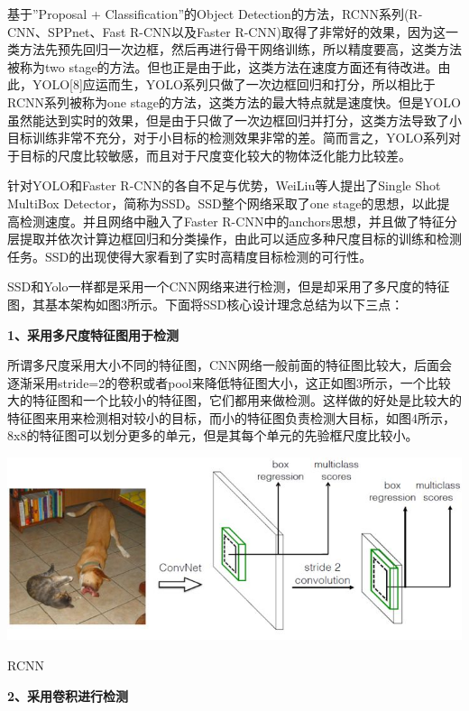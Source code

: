 基于”Proposal + Classification”的Object Detection的方法，RCNN系列(R-CNN、SPPnet、Fast R-CNN以及Faster R-CNN)取得了非常好的效果，因为这一类方法先预先回归一次边框，然后再进行骨干网络训练，所以精度要高，这类方法被称为two stage的方法。但也正是由于此，这类方法在速度方面还有待改进。由此，YOLO[8]应运而生，YOLO系列只做了一次边框回归和打分，所以相比于RCNN系列被称为one stage的方法，这类方法的最大特点就是速度快。但是YOLO虽然能达到实时的效果，但是由于只做了一次边框回归并打分，这类方法导致了小目标训练非常不充分，对于小目标的检测效果非常的差。简而言之，YOLO系列对于目标的尺度比较敏感，而且对于尺度变化较大的物体泛化能力比较差。

针对YOLO和Faster R-CNN的各自不足与优势，WeiLiu等人提出了Single Shot MultiBox Detector，简称为SSD。SSD整个网络采取了one stage的思想，以此提高检测速度。并且网络中融入了Faster R-CNN中的anchors思想，并且做了特征分层提取并依次计算边框回归和分类操作，由此可以适应多种尺度目标的训练和检测任务。SSD的出现使得大家看到了实时高精度目标检测的可行性。

SSD和Yolo一样都是采用一个CNN网络来进行检测，但是却采用了多尺度的特征图，其基本架构如图3所示。下面将SSD核心设计理念总结为以下三点：

\textbf{1、采用多尺度特征图用于检测 }

所谓多尺度采用大小不同的特征图，CNN网络一般前面的特征图比较大，后面会逐渐采用stride=2的卷积或者pool来降低特征图大小，这正如图3所示，一个比较大的特征图和一个比较小的特征图，它们都用来做检测。这样做的好处是比较大的特征图来用来检测相对较小的目标，而小的特征图负责检测大目标，如图4所示，8x8的特征图可以划分更多的单元，但是其每个单元的先验框尺度比较小。
\begin{uscfigure}
	\includegraphics[width=\textwidth]{./Pictures/ssd_(1).jpg}	
	\caption{RCNN}
\end{uscfigure}
\textbf{2、采用卷积进行检测}

